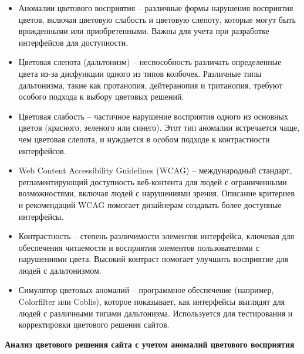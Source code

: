 \begin{itemize}
    \item Аномалии цветового восприятия – различные формы нарушения восприятия цветов, включая цветовую слабость и цветовую слепоту, которые могут быть врожденными или приобретенными. Важны для учета при разработке интерфейсов для доступности.
    \item Цветовая слепота (дальтонизм) – неспособность различать определенные цвета из-за дисфункции одного из типов колбочек. Различные типы дальтонизма, такие как протанопия, дейтеранопия и тританопия, требуют особого подхода к выбору цветовых решений.
    \item Цветовая слабость – частичное нарушение восприятия одного из основных цветов (красного, зеленого или синего). Этот тип аномалии встречается чаще, чем цветовая слепота, и нуждается в особом подходе к контрастности интерфейсов.
    \item Web Content Accessibility Guidelines (WCAG) – международный стандарт, регламентирующий доступность веб-контента для людей с ограниченными возможностями, включая людей с нарушениями зрения. Описание критериев и рекомендаций WCAG помогает дизайнерам создавать более доступные интерфейсы.
    \item Контрастность – степень различимости элементов интерфейса, ключевая для обеспечения читаемости и восприятия элементов пользователями с нарушениями цвета. Высокий контраст помогает улучшить восприятие для людей с дальтонизмом.
    \item Симулятор цветовых аномалий – программное обеспечение (например, Colorfilter или Coblis), которое показывает, как интерфейсы выглядят для людей с различными типами дальтонизма. Используется для тестирования и корректировки цветового решения сайтов.
\end{itemize}
\bigskip

\textbf{Анализ цветового решения сайта с учетом аномалий цветового восприятия}

